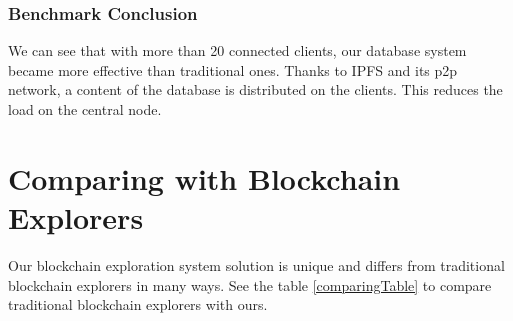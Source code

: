 \subsubsection{Benchmark Conclusion}
We can see that with more than 20 connected clients, our database system became more effective than traditional ones. Thanks to IPFS and its p2p network, a content of the database is distributed on the clients. This reduces the load on the central node.

\section{Comparing with Blockchain Explorers}
Our blockchain exploration system solution is unique and differs from traditional blockchain explorers in many ways. See the table \ref{comparingTable} to compare traditional blockchain explorers with ours. 

